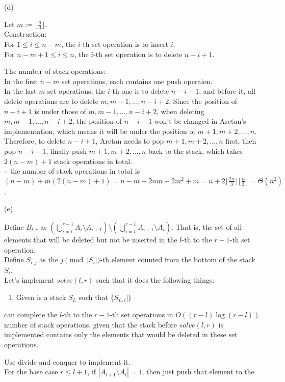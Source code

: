 \begin{pr}$ $\\
(d)

Let $m:=\lfloor\frac n3\rfloor$.\\
Construction:\\
For $1\leq i\leq n-m$, the $i$-th set operation is to insert $i$.\\
For $n-m+1\leq i\leq n$, the $i$-th set operation is to delete $n-i+1$.

The number of stack operations:\\
In the first $n-m$ set operations, each contains one push operaion.\\
In the last $m$ set operations, the $i$-th one is to delete $n-i+1$, and before it, all delete operations are to delete $m, m-1, \dots, n-i+2$. Since the position of $n-i+1$ is under those of $m, m-1, \dots, n-i+2$, when deleting $m, m-1, \dots, n-i+2$, the position of $n-i+1$ won't be changed in Arctan's implementation, which means it will be under the position of $m+1, m+2, \dots, n$. Therefore, to delete $n-i+1$, Arctan needs to pop $m+1, m+2, \dots, n$ first, then pop $n-i+1$, finally push $m+1, m+2, \dots, n$ back to the stack, which takes $2(n-m)+1$ stack operations in total.\\
$\therefore$ the number of stack operations in total is $(n-m)+m(2(n-m)+1)=n-m+2nm-2m^2+m=n+2\lceil\frac{2n}3\rceil\lfloor\frac n3\rfloor=\Theta(n^2)$.

(e)

Define $B_{l, r}$ as $\left(\bigcup_{i=l}^{r-1}A_i\setminus A_{i+1}\right)\setminus\left(\bigcup_{i=l}^{r-1}A_{i+1}\setminus A_i\right)$. That is, the set of all elements that will be deleted but not be inserted in the $l$-th to the $r-1$-th set operation.\\
Define $S_{i, j}$ as the $j\pmod{|S_i|}$-th element counted from the bottom of the stack $S_i$.\\
Let's implement $solve(l, r)$ such that it does the following things:
\begin{enumerate}
\item Given is a stack $S_L$ such that $\{S_{L, i}|\}$
\end{enumerate}
can complete the $l$-th to the $r-1$-th set operations in $O((r-l)\log(r-l))$ number of stack operations, given that the stack before $solve(l, r)$ is implemented contains only the elements that would be deleted in these set operations.

Use divide and conquer to implement it.\\
For the base case $r\leq l+1$, if $|A_{l+1}\setminus A_l|=1$, then just push that element to the 
\end{pr}
